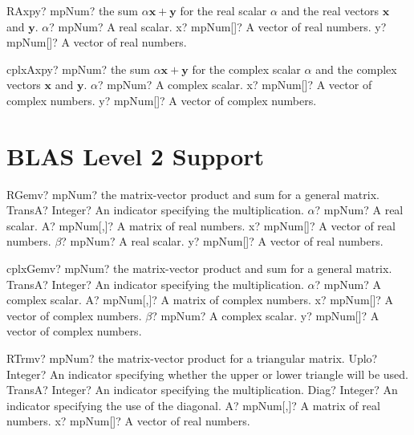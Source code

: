 \documentclass[12pt,a4paper,openany]{book}
\begin{document}
\begin{mpFunctionsExtract}
\mpFunctionThree
{RAxpy? mpNum?  the sum $\alpha \boldsymbol{x} + \boldsymbol{y}$ for the real scalar $\alpha$ and the real vectors $\boldsymbol{x}$ and $\boldsymbol{y}$.}
{$\alpha$? mpNum? A real scalar.}
{x? mpNum[]? A vector of real numbers.}
{y? mpNum[]? A vector of real numbers.}
\end{mpFunctionsExtract}

\begin{mpFunctionsExtract}
\mpFunctionThree
{cplxAxpy? mpNum? the sum $\alpha \boldsymbol{x} + \boldsymbol{y}$ for the complex scalar $\alpha$ and the complex vectors $\boldsymbol{x}$ and $\boldsymbol{y}$.}
{$\alpha$? mpNum? A complex scalar.}
{x? mpNum[]? A vector of complex numbers.}
{y? mpNum[]? A vector of complex numbers.}
\end{mpFunctionsExtract}

\section{BLAS Level 2 Support}

\begin{mpFunctionsExtract}
\mpFunctionSix
{RGemv? mpNum? the matrix-vector product and sum for a general matrix.}
{TransA? Integer? An indicator specifying the multiplication.}
{$\alpha$? mpNum? A real scalar.}
{A? mpNum[,]? A matrix of real numbers.}
{x? mpNum[]? A vector of real numbers.}
{$\beta$? mpNum? A real scalar.}
{y? mpNum[]? A vector of real numbers.}
\end{mpFunctionsExtract}

\begin{mpFunctionsExtract}
\mpFunctionSix
{cplxGemv? mpNum? the matrix-vector product and sum for a general matrix.}
{TransA? Integer? An indicator specifying the multiplication.}
{$\alpha$? mpNum? A complex scalar.}
{A? mpNum[,]? A matrix of complex numbers.}
{x? mpNum[]? A vector of complex numbers.}
{$\beta$? mpNum? A complex scalar.}
{y? mpNum[]? A vector of complex numbers.}
\end{mpFunctionsExtract}

\begin{mpFunctionsExtract}
\mpFunctionFive
{RTrmv? mpNum?  the matrix-vector product for a triangular matrix.}
{Uplo? Integer? An indicator specifying whether the upper or lower triangle will be used.}
{TransA? Integer? An indicator specifying the multiplication.}
{Diag? Integer? An indicator specifying the use of the diagonal.}
{A? mpNum[,]? A matrix of real numbers.}
{x? mpNum[]? A vector of real numbers.}
\end{mpFunctionsExtract}
\end{document}
